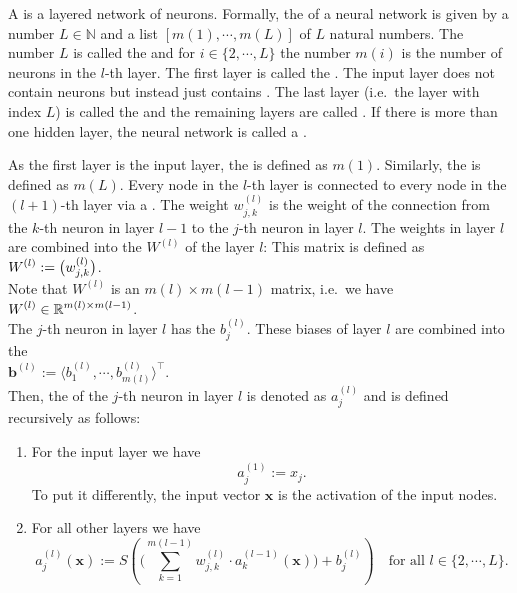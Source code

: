 A  is a layered network of neurons.  Formally, the  of a neural network is
given by a number $L \in \mathbb{N}$ and a list $[m(1), \cdots, m(L)]$ of $L$ natural numbers.  The number
$L$ is called the  and for $i \in \{2,\cdots,L\}$ the number $m(i)$ is the number of
neurons in the $l$-th layer.  The first layer is called the .  The input layer does not contain
neurons but instead just contains .  The last layer (i.e.~the
layer with index $L$) is called the  and the remaining layers are called 
.  If there is more than one hidden layer, the neural network is called a
.

As the first layer is the input layer, the  is defined as
$m(1)$.  Similarly, the  is defined as $m(L)$.
Every node in the $l$-th layer is connected to every node in the $(l+1)$-th layer via a .
The weight $w_{j,k}^{(l)}$ is the weight of the connection from the $k$-th neuron in layer $l-1$ to
the $j$-th neuron in layer $l$.  The weights in layer $l$ are combined into the  $W^{(l)}$ of
the layer $l$: This matrix is defined as
\\[0.2cm]
\hspace*{1.3cm}
$\displaystyle W^{(l)} := \bigl( w_{j,k}^{(l)} \bigr)$.
\\[0.2cm]
Note that $W^{(l)}$ is an $m(l) \times m(l-1)$ matrix, i.e.~we have
\\[0.2cm]
\hspace*{1.3cm}
$\displaystyle W^{(l)} \in \mathbb{R}^{m(l) \times m(l-1)}$.
\\[0.2cm]
The $j$-th neuron in layer $l$ has the  $b_j^{(l)}$.  These biases of layer $l$ are combined into
the 
\\[0.2cm]
\hspace*{1.3cm}
$\mathbf{b}^{(l)} := \langle b_1^{(l)}, \cdots, b_{m(l)}^{(l)} \rangle^\top$.
\\[0.2cm]
Then, the  of the $j$-th neuron
in layer $l$ is denoted as $a_j^{(l)}$ and is defined recursively as follows:
\begin{enumerate}
\item For the input layer we have
      \begin{equation}
        \label{eq:feedforward1}
       a^{(1)}_j := x_j.
       \tag{FF1}
      \end{equation}
      To put it differently, the input vector $\mathbf{x}$ is the activation of the input nodes.
\item For all other layers we have
      \begin{equation}
         \label{eq:feedforward2}
         a_j^{(l)}(\mathbf{x}) := 
             S\left(\Biggl(\sum\limits_{k=1}^{m(l-1)} w_{j,k}^{(l)}\cdot a_k^{(l-1)}(\mathbf{x})\Biggr) + b_{j}^{(l)}\right) 
        \quad \mbox{for all $l \in \{2, \cdots, L\}$}.
       \tag{FF2}
\end{equation}
\end{enumerate}
